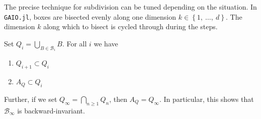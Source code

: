 \begin{remark}
    The precise technique for subdivision can be tuned depending on the situation. In 
    \texttt{GAIO.jl}, boxes are bisected evenly along one dimension 
    $k \in \left\{1,\ \dotsc,\ d\right\}$. The dimension $k$ along which to bisect is 
    cycled through during the steps. \\
\end{remark}

\begin{proposition}
    \cite*{algGAIO,subalg} Set $Q_i = \bigcup\limits_{B \in \mathcal{B}_i} B$. For all 
    $i$ we have

    \begin{enumerate}
        \item $Q_{i+1} \subset Q_i$
        \item $A_Q \subset Q_i$ 
    \end{enumerate}

    Further, if we set $Q_\infty = \bigcap\limits_{n \geq 1} Q_n$, then 
    $A_Q = Q_\infty$. In particular, this shows that $\mathcal{B}_\infty$ 
    is backward-invariant. 
\end{proposition}

